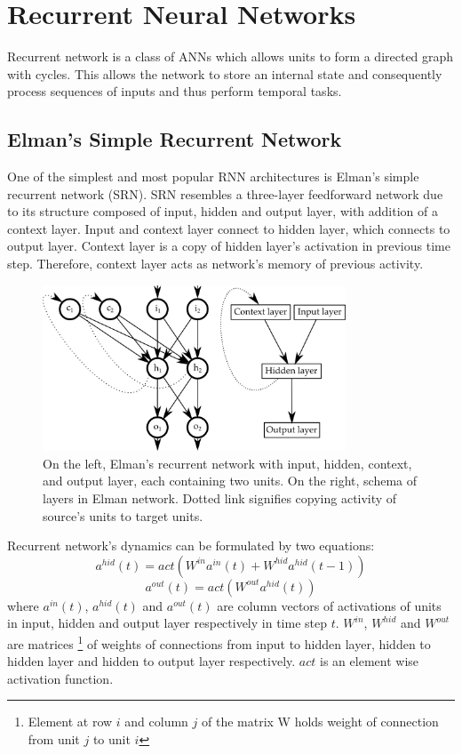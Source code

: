 \documentclass[12pt,oneside]{fithesis2}
\begin{document}

\section{Recurrent Neural Networks}
Recurrent network is a class of ANNs which allows units to form a directed graph with cycles. This allows the network to store an internal state and consequently process sequences of inputs and thus perform temporal tasks.



\subsection{Elman's Simple Recurrent Network}
One of the simplest and most popular RNN architectures is Elman's  simple recurrent network (SRN). SRN resembles a three-layer feedforward network due to its structure composed of input, hidden and output layer, with addition of a context layer. Input and context layer connect to hidden layer, which connects to output layer. Context layer is a copy of hidden layer's activation in previous time step. Therefore, context layer acts as network's memory of previous activity.

	\begin{figure}[ht]
		\centering
		\includegraphics[width=341px]{elman-rnn.png}
		\caption{On the left, Elman's recurrent network with input, hidden, context, and output layer, each containing two units. On the right, schema of layers in Elman network. Dotted link signifies copying activity of source's units to target units.}
	\end{figure}

Recurrent network's dynamics can be formulated by two equations:
$$a^{hid}(t) = act\left( W^{in}a^{in}(t) + W^{hid} a^{hid}(t-1)\right)$$
$$a^{out}(t) = act\left( W^{out}a^{hid}(t)\right)$$
where $a^{in}(t)$, $a^{hid}(t)$ and $a^{out}(t)$ are column vectors of activations of units in input, hidden and output layer respectively in time step $t$. $W^{in}$, $W^{hid}$ and $W^{out}$ are matrices \footnote{Element at row $i$ and column $j$ of the matrix W holds weight of connection from unit $j$ to unit $i$} of weights of connections from input to hidden layer, hidden to hidden layer and hidden to output layer respectively. $act$ is an element wise activation function.\par
\end{document}
